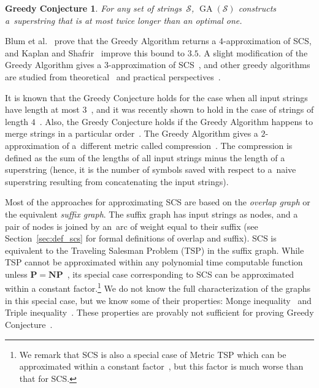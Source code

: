 \newtheorem*{gc}{Greedy Conjecture}
\begin{gc}
For any set of strings~$\mathcal{S}$, $\operatorname{GA}(\mathcal{S})$ constructs a~superstring that is at most twice longer than an optimal one.
\end{gc}


Blum et al.~\cite{BJLTY1991} prove that the Greedy Algorithm returns a $4$-approximation of SCS, and Kaplan and Shafrir~\cite{KS2005} improve this bound to $3.5$. A slight modification of the Greedy Algorithm gives a $3$-approximation of SCS~\cite{BJLTY1991}, and other greedy algorithms are studied from theoretical~\cite{BJLTY1991,rivals2018superstrings} and practical perspectives~\cite{romero2004experimental, cazaux2018practical}.

It is known that the Greedy Conjecture holds for the case when all input strings have length at most $3$~\cite{TU1988, cazaux20143}, and it was recently shown to hold in the case of strings of length $4$~\cite{kulikov2015greedy}. Also, the Greedy Conjecture holds if the Greedy Algorithm happens to merge strings in a particular order~\cite{weinard2006greedy, laube2005conditional}. The Greedy Algorithm gives a $2$-approximation of a~different metric called compression~\cite{TU1988}. The compression is defined as the sum of the lengths of all input strings minus the length of a superstring
(hence, it is the number of symbols saved with respect to a~naive superstring resulting from concatenating the input strings).



Most of the approaches for approximating SCS are based on the
{\em overlap graph} or the equivalent \emph{suffix graph}. The suffix graph has input strings as nodes, and a pair of nodes 
is joined by an~arc of weight equal to their suffix (see Section~\ref{sec:def_scs} for formal definitions of overlap and suffix).
SCS is equivalent to the Traveling Salesman Problem (TSP) in the suffix graph. While TSP cannot be approximated within any polynomial time computable function unless $\mathbf{P}=\mathbf{NP}$~\cite{SG1976}, its special case corresponding to SCS can be approximated within a constant factor.\footnote{We remark that SCS is also a special case of Metric TSP which can be approximated within a constant factor~\cite{svensson2018constant}, but this factor is much worse than that for SCS.} We do not know the full characterization of the graphs in this special case, but we know some of their properties: Monge inequality~\cite{monge} and Triple inequality~\cite{weinard2006greedy}. These properties are provably not sufficient for proving Greedy Conjecture~\cite{weinard2006greedy, laube2005conditional}. 

